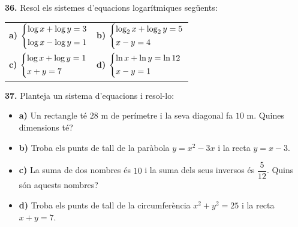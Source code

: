 \documentclass[13pt,a4paper]{extarticle}
\begin{document}
\par\noindent\begin{minipage}{\linewidth}
\textbf{36.} Resol els sistemes d'equacions logarítmiques següents:\par

\vspace{5pt}
\begin{tabular}{@{}p{.46\linewidth}p{.46\linewidth}@{}}
\textbf{a)} $\begin{dcases}\log x+\log y=3\\[1pt]\log x-\log y=1\end{dcases}$ & \textbf{b)} $\begin{dcases}\log_2 x+\log_2 y=5\\[1pt]x-y=4\end{dcases}$ \\[20pt]
\textbf{c)} $\begin{dcases}\log x+\log y=1\\[1pt]x+y=7\end{dcases}$ & \textbf{d)} $\begin{dcases}\ln x+\ln y=\ln 12\\[1pt]x-y=1\end{dcases}$ \\[20pt]
\end{tabular}\par
\end{minipage}\par\vspace{1.6mm}
\par\noindent\begin{minipage}{\linewidth}
\textbf{37.} Planteja un sistema d'equacions i resol-lo:\par

\begin{itemize}[leftmargin=0pt,itemsep=6pt,topsep=4pt,parsep=0pt,label={}]
\item \textbf{a)} Un rectangle té $28$ m de perímetre i la seva diagonal fa $10$ m. Quines dimensions té?
\item \textbf{b)} Troba els punts de tall de la paràbola $y=x^2-3x$ i la recta $y=x-3$.
\item \textbf{c)} La suma de dos nombres és $10$ i la suma dels seus inversos és $\dfrac{5}{12}$. Quins són aquests nombres?
\item \textbf{d)} Troba els punts de tall de la circumferència $x^2+y^2=25$ i la recta $x+y=7$.
\end{itemize}
\end{minipage}\par\vspace{1.6mm}
\end{document}
